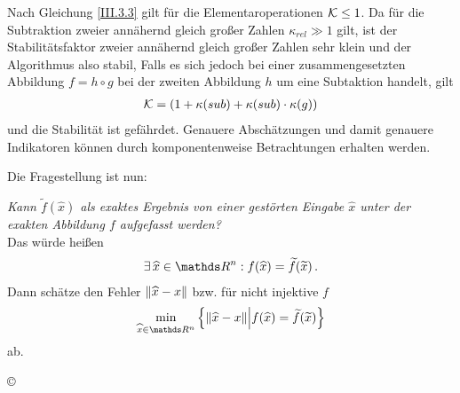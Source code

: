 \begin{Bspe}
  Nach Gleichung \eqref{III.3.3} gilt für die Elementaroperationen $\K\leq 1$.
  Da für die Subtraktion zweier annähernd gleich großer Zahlen $\kappa_{rel}\gg 1$ gilt,
  ist der Stabilitätsfaktor zweier annähernd gleich großer
  Zahlen sehr klein und der Algorithmus also stabil,
  Falls es sich jedoch bei einer zusammengesetzten Abbildung $f=h\circ g$
  bei der zweiten Abbildung $h$ um eine Subtaktion handelt, gilt
  \begin{gather*}
    \K =(1+\kappa(sub)+\kappa(sub)\cdot\kappa(g))
  \end{gather*}
  und die Stabilität ist gefährdet.
  Genauere Abschätzungen und damit genauere Indikatoren
  können durch komponentenweise Betrachtungen erhalten werden.
\end{Bspe}


 
Die Fragestellung ist nun:

\textit{Kann $\widetilde{f}(\widehat{x})$ als exaktes Ergebnis von einer gestörten Eingabe $\widehat{x}$ unter der exakten Abbildung $f$ aufgefasst werden?}\\

Das würde heißen
\begin{gather*}
  \exists\, \widehat{x}\in \Ren: f(\widehat{x})= \widetilde{f}(\widetilde{x})\, .
\end{gather*}
Dann schätze den Fehler $ \nn[\widehat{x}-x]$
bzw. für nicht injektive $f$
\begin{gather*}
  \min_{\widehat{x}\in \Ren}
  \left\{
    \nn[\widehat{x}-x] 
    \middle\vert f(\widehat{x}) = \widetilde{f}(\widetilde{x}) 
  \right\}
\end{gather*} 
ab. 

\begin{image}{\copyright}
\end{image}

